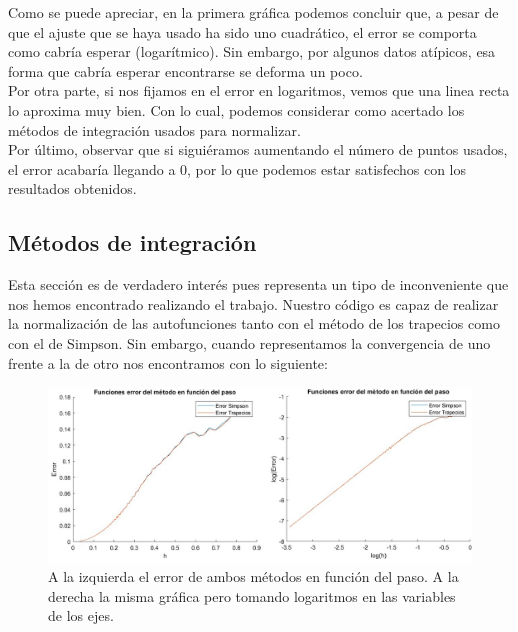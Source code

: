\documentclass[12pt]{article}
\begin{document}
\newpage
Como se puede apreciar, en la primera gráfica podemos concluir
que, a pesar de que el ajuste que se haya usado ha sido uno 
cuadrático, el error se comporta como cabría esperar (logarítmico).
Sin embargo, por algunos datos atípicos, esa forma que cabría esperar encontrarse se deforma un poco. \\

Por otra parte, si nos fijamos en el error en logaritmos, 
vemos que una linea recta lo aproxima muy bien. Con lo cual, 
podemos considerar como acertado los métodos de integración usados
para normalizar. \\

Por último, observar que si siguiéramos aumentando el número de puntos usados, el error acabaría llegando a 0, por lo que podemos estar satisfechos con los resultados obtenidos.

\subsection{Métodos de integración}

    Esta sección es de verdadero interés pues representa un tipo de inconveniente que nos hemos encontrado realizando el trabajo. Nuestro código es capaz de realizar la normalización de las autofunciones tanto con el método de los trapecios como con el de Simpson. Sin embargo, cuando representamos la convergencia de uno frente a la de otro nos encontramos con lo siguiente:

\begin{figure}[H]
    \centering
    \begin{adjustbox}{width=1.2\linewidth,center}
        \includegraphics{fotos/comparacionsimpsontrapecios.png}
    \end{adjustbox}
    \caption{A la izquierda el error de ambos métodos en función del paso. A la derecha la misma gráfica pero tomando logaritmos en las variables de los ejes.}
\end{figure}
\end{document}
